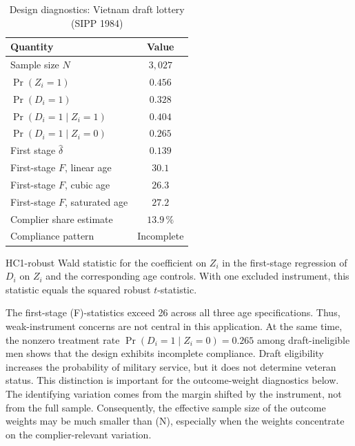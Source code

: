 \documentclass[12pt, a4paper, oneside]{article}
\theoremstyle{plain}
\theoremstyle{definition}
\begin{document}
\begin{table}[htbp]
\centering
\caption{Design diagnostics: Vietnam draft lottery (SIPP 1984)}
\label{tab:vietnam_descr}
\begin{threeparttable}
\begin{tabular}{@{}lc@{}}
\toprule
Quantity & Value \\
\midrule
Sample size $N$                              & $3{,}027$ \\
$\Pr(Z_i = 1)$                               & $0.456$   \\
$\Pr(D_i = 1)$                               & $0.328$   \\
$\Pr(D_i = 1 \mid Z_i = 1)$                  & $0.404$   \\
$\Pr(D_i = 1 \mid Z_i = 0)$                  & $0.265$   \\
First stage $\hat\delta$                     & $0.139$   \\
First-stage $F$, linear age\tnote{a}         & $30.1$    \\
First-stage $F$, cubic age\tnote{a}          & $26.3$    \\
First-stage $F$, saturated age\tnote{a}      & $27.2$    \\
Complier share estimate\tnote{b}             & $13.9\,\%$ \\
Compliance pattern                           & Incomplete \\
\bottomrule
\end{tabular}
\begin{tablenotes}
  \footnotesize
  \item[$^a$] HC1-robust Wald statistic for the coefficient on \(Z_i\)
  in the first-stage regression of \(D_i\) on \(Z_i\) and the corresponding
  age controls. With one excluded instrument, this statistic equals the
  squared robust \(t\)-statistic.
\end{tablenotes}
\end{threeparttable}
\end{table}
The first-stage (F)-statistics exceed 26 across all three age specifications. Thus, weak-instrument concerns are not central in this application.
At the same time, the nonzero treatment rate $\Pr(D_i=1 \mid Z_i=0) = 0.265$ among draft-ineligible men shows that the design exhibits incomplete compliance. Draft eligibility increases the probability of military service, but it does not determine veteran status. This distinction is important for the outcome-weight diagnostics below. The identifying variation comes from the margin shifted by the instrument, not from the full sample. Consequently, the effective sample size of the outcome weights may be much smaller than (N), especially when the weights concentrate on the complier-relevant variation.\\
\end{document}
